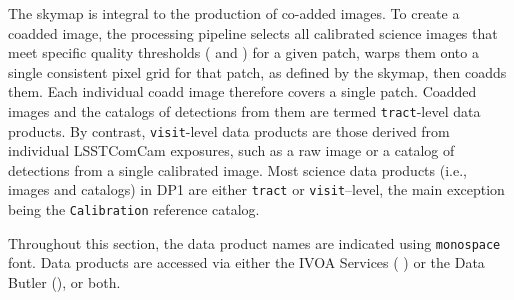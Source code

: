 The skymap is integral to the production of co-added images.
To create a coadded image, the processing pipeline selects all calibrated science images that meet specific quality thresholds ( and ) for a given \gls{patch}, warps them onto a single consistent pixel grid for that \gls{patch}, as defined by the skymap, then coadds them.
Each individual coadd image therefore covers a single \gls{patch}.
Coadded images and the catalogs of detections from them are termed \texttt{tract}-level data products.
By contrast, \texttt{visit}-level data products are those derived from individual \gls{LSSTComCam} exposures, such as a raw image or a catalog of detections from a single calibrated image.
Most science data products (i.e., images and catalogs) in \gls{DP1} are either \texttt{tract} or \texttt{visit}--level, the main exception being the \texttt{Calibration} reference catalog.

Throughout this section, the data product names are indicated using \texttt{monospace} font.
Data products are accessed via either the \gls{IVOA} Services ( ) or the Data \gls{Butler} (), or both.





